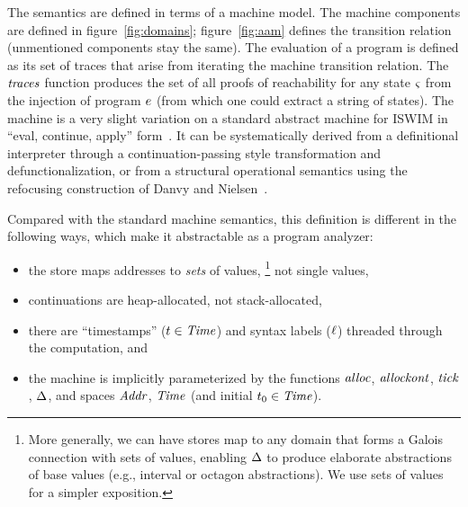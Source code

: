 \documentclass[9pt]{sigplanconf} %
\begin{document}
The semantics are defined in terms of a machine model.
%
The machine components are defined in figure~\ref{fig:domains};
%
figure~\ref{fig:aam} defines the transition relation (unmentioned components stay the same).
%
The evaluation of a program is defined as its set of traces that arise from iterating the machine transition relation.
%
The $\mathit{traces}$ function produces the set of all proofs of reachability for any state $\varsigma$ from the injection of program $e$ (from which one could extract a string of states).
%
 The machine is a very slight variation on a standard abstract machine for ISWIM in ``eval, continue, apply'' form~\cite{dvanhorn:Danvy:DSc}.
%
It can be systematically derived from a definitional interpreter through a continuation-passing style transformation and defunctionalization, or from a structural operational semantics using the refocusing construction of Danvy and Nielsen~\cite{dvanhorn:Danvy-Nielsen:RS-04-26}.

Compared with the standard machine semantics, this definition is
different in the following ways, which make it abstractable as a
program analyzer:
\begin{itemize}
\item the store maps addresses to \emph{sets} of values,
%
\footnote{
More generally, we can have stores map to any domain that forms a Galois connection with sets of values, enabling $\Delta$ to produce elaborate abstractions of base values (e.g., interval or octagon abstractions).
%
We use sets of values for a simpler exposition.
}
%
not single values,

\item continuations are heap-allocated, not stack-allocated,
%
\item there are ``timestamps'' (${t} \in \mathit{Time}$) and syntax labels (${\ell}$) threaded through the computation, and
%
\item the machine is implicitly parameterized by the functions $\mathit{alloc}$, $\mathit{allockont}$, $\mathit{tick}$, $\Delta$, and spaces $\mathit{Addr}$, $\mathit{Time}$ (and initial ${t}_0 \in \mathit{Time}$).
\end{itemize}
\end{document}
